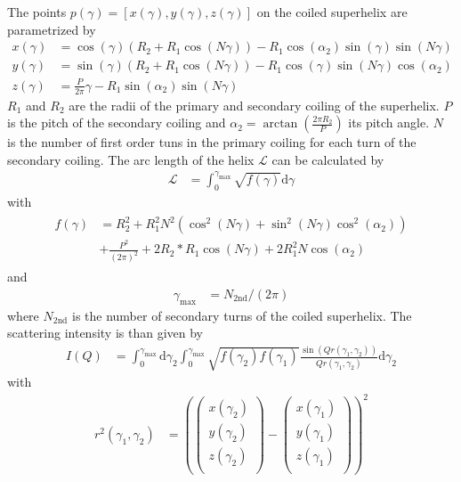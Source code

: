 The points $p(\gamma)=\left[x(\gamma),y(\gamma),z(\gamma)\right]$ on the coiled superhelix are parametrized by
\begin{align}
x(\gamma) &= \cos\left(\gamma\right) \left(R_2+R_1\cos\left(N\gamma\right)\right)
            - R_1\cos\left(\alpha_2\right)\sin\left(\gamma\right)\sin\left(N\gamma\right) \\
y(\gamma) &= \sin\left(\gamma\right) \left(R_2+R_1\cos\left(N\gamma\right)\right)
            - R_1\cos\left(\gamma\right)\sin\left(N\gamma\right)\cos\left(\alpha_2\right) \\
z(\gamma) &= \frac{P}{2\pi}\gamma - R_1\sin\left(\alpha_2\right)\sin\left(N\gamma\right)
\end{align}
$R_1$ and $R_2$ are the radii of the primary and secondary coiling of the superhelix. $P$ is the pitch of the secondary coiling and $\alpha_2= \arctan\left(\frac{2\pi R_2}{P}\right)$ its pitch angle. $N$ is the number of first order tuns in the primary coiling for each turn of the secondary coiling.
The arc length of the helix $\mathcal{L}$ can be calculated by
\begin{align}
\mathcal{L} &= \int_0^{\gamma_\mathrm{max}} \sqrt{f(\gamma)} \mathrm{d}\gamma
\end{align}
with
\begin{align}
\begin{split}
f(\gamma) &= R_2^2+R_1^2N^2 \left(\cos^2\left(N\gamma\right)+\sin^2\left(N\gamma\right)\cos^2(\alpha_2)\right) \\
&+\frac{P^2}{(2\pi)^2} + 2R_2*R_1\cos\left(N\gamma\right) +2R_1^2N\cos(\alpha_2)
\end{split}
\end{align}
and
\begin{align}
\gamma_\mathrm{max} &= N_\mathrm{2nd}/(2\pi)
\end{align}
where $N_\mathrm{2nd}$ is the number of secondary turns of the coiled superhelix.
The scattering intensity is than given by
\begin{align}
I(Q) &= \int_0^{\gamma_\mathrm{max}} \mathrm{d}\gamma_2 \int_0^{\gamma_\mathrm{max}} \sqrt{f(\gamma_2)f(\gamma_1)}
\frac{\sin\left( Qr(\gamma_1,\gamma_2)\right)}{Qr(\gamma_1,\gamma_2)} \mathrm{d}\gamma_2
\end{align}
with
\begin{align}
r^2(\gamma_1,\gamma_2) &= \left( \begin{pmatrix}
                            x(\gamma_2) \\
                            y(\gamma_2) \\
                            z(\gamma_2) \\
                          \end{pmatrix}
                        - \begin{pmatrix}
                            x(\gamma_1) \\
                            y(\gamma_1) \\
                            z(\gamma_1) \\
                          \end{pmatrix} \right)^2
\end{align}

